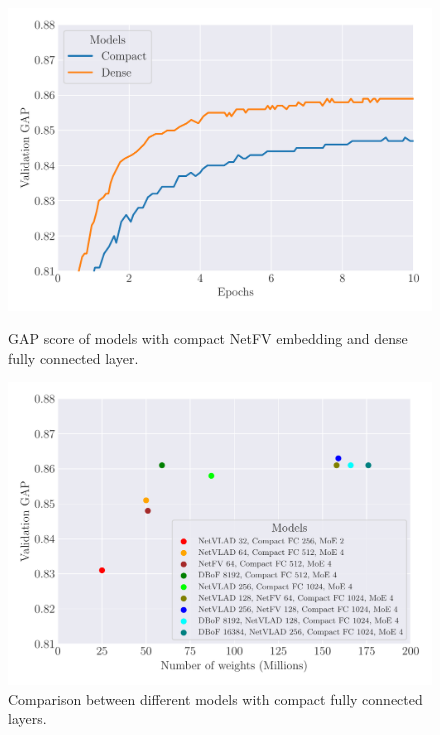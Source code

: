 \begin{figure}[p!]
  \center
  \includegraphics[width=\scalefigure\textwidth]{figures/appendix/ap2-training_video_classification/graph_fc_circulant_embedding_netfv}
  \caption{GAP score of models with compact NetFV embedding and dense fully connected layer.}
  \label{figure:ap2-validation_gap_compact_netfv}
  \vspace{2cm}
  \includegraphics[width=\scalefigure\textwidth]{figures/appendix/ap2-training_video_classification/graph_benchmark_models}
  \caption{Comparison between different models with compact fully connected layers.}
  \label{figure:ap2-models}
\end{figure}


